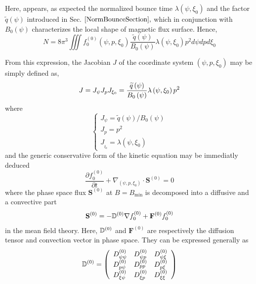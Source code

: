 Here, appears, as expected the normalized bounce time $\lambda \left( \psi
,\xi _{0}\right) $ and the factor $\widetilde{q}\left( \psi \right) $
introduced in Sec. $\ref{NormBounceSection},$ which in conjunction with $%
B_{0}\left( \psi \right) $ characterizes the local shape of magnetic flux
surface. Hence,
\begin{equation}
N=8\pi ^{3}\iiint f_{0}^{\left( 0\right) }\left( \psi ,p,\xi _{0}\right)
\frac{\widetilde{q}\left( \psi \right) }{B_{0}\left( \psi \right) }\lambda
\left( \psi ,\xi _{0}\right) p^{2}d\psi dpd\xi _{0}
\end{equation}

From this expression, the Jacobian $J$ of the coordinate system $\left( \psi
,p,\xi _{0}\right) $ may be simply defined as,
\begin{equation}
J=J_{\psi }J_{p}J_{\xi _{0}}=\frac{\widetilde{q}\left( \psi \right) }{%
B_{0}\left( \psi \right) }\lambda \left( \psi ,\xi _{0}\right) p^{2}
\end{equation}
where
\begin{equation}
\left\{
\begin{array}{l}
J_{\psi }=\widetilde{q}\left( \psi \right) /B_{0}\left( \psi \right)  \\
J_{p}=p^{2} \\
J_{_{\xi _{0}}}=\lambda \left( \psi ,\xi _{0}\right)
\end{array}
\right.
\end{equation}
and the generic conservative form of the kinetic equation may be immediatly
deduced
\begin{equation}
\frac{\partial f_{0}^{\left( 0\right) }}{\partial t}+\nabla _{\left( \psi
,p,\xi _{0}\right) }\cdot \mathbf{S}^{\left( 0\right) }=0
\end{equation}
where the phase space flux $\mathbf{S}^{\left( 0\right) }$ at $B=B_{\min }$
is decomposed into a diffusive and a convective part
\begin{equation}
\mathbf{S}^{\left( 0\right) }=-\Bbb{D}^{\left( 0\right) }\nabla
f_{0}^{\left( 0\right) }+\mathbf{F}^{\left( 0\right) }f_{0}^{\left( 0\right)
}
\end{equation}
in the mean field theory. Here, $\Bbb{D}^{\left( 0\right) }$ and $\mathbf{F}%
^{\left( 0\right) }$ are respectively the diffusion tensor and convection
vector in phase space. They can be expressed generally as
\begin{equation}
\Bbb{D}^{\left( 0\right) }=\left(
\begin{array}{lll}
D_{\psi \psi }^{\left( 0\right) } & D_{\psi p}^{\left( 0\right) } & D_{\psi
\xi }^{\left( 0\right) } \\
D_{p \psi }^{\left( 0\right) } & D_{pp}^{\left( 0\right) } & D_{p \xi
}^{\left( 0\right) } \\
D_{\xi \psi }^{\left( 0\right) } & D_{\xi p}^{\left( 0\right) } & D_{\xi \xi
}^{\left( 0\right) }
\end{array}
\right)
\end{equation}
